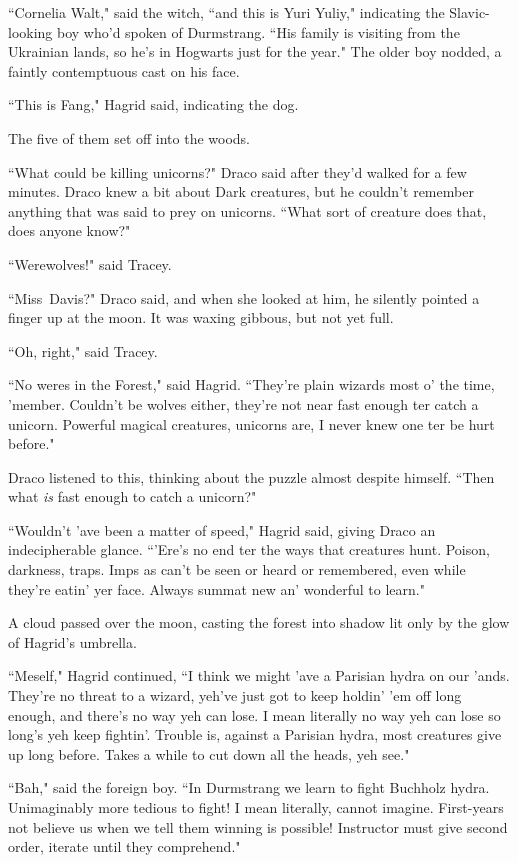 ``Cornelia Walt," said the witch, ``and this is Yuri Yuliy," indicating the Slavic-looking boy who'd spoken of Durmstrang. ``His family is visiting from the Ukrainian lands, so he's in Hogwarts just for the year." The older boy nodded, a faintly contemptuous cast on his face.

``This is Fang," Hagrid said, indicating the dog.

The five of them set off into the woods.

``What could be killing unicorns?" Draco said after they'd walked for a few minutes. Draco knew a bit about Dark creatures, but he couldn't remember anything that was said to prey on unicorns. ``What sort of creature does that, does anyone know?"

``Werewolves!" said Tracey.

``Miss~Davis?" Draco said, and when she looked at him, he silently pointed a finger up at the moon. It was waxing gibbous, but not yet full.

``Oh, right," said Tracey.

``No weres in the Forest," said Hagrid. ``They're plain wizards most o' the time, 'member. Couldn't be wolves either, they're not near fast enough ter catch a unicorn. Powerful magical creatures, unicorns are, I never knew one ter be hurt before."

Draco listened to this, thinking about the puzzle almost despite himself. ``Then what \emph{is} fast enough to catch a unicorn?"

``Wouldn't 'ave been a matter of speed," Hagrid said, giving Draco an indecipherable glance. ``'Ere's no end ter the ways that creatures hunt. Poison, darkness, traps. Imps as can't be seen or heard or remembered, even while they're eatin' yer face. Always summat new an' wonderful to learn."

A cloud passed over the moon, casting the forest into shadow lit only by the glow of Hagrid's umbrella.

``Meself," Hagrid continued, ``I think we might 'ave a Parisian hydra on our 'ands. They're no threat to a wizard, yeh've just got to keep holdin' 'em off long enough, and there's no way yeh can lose. I mean literally no way yeh can lose so long's yeh keep fightin'. Trouble is, against a Parisian hydra, most creatures give up long before. Takes a while to cut down all the heads, yeh see."

``Bah," said the foreign boy. ``In Durmstrang we learn to fight Buchholz hydra. Unimaginably more tedious to fight! I mean literally, cannot imagine. First-years not believe us when we tell them winning is possible! Instructor must give second order, iterate until they comprehend."

